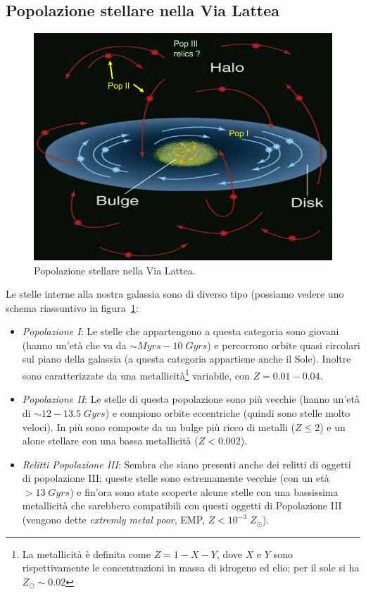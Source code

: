 \subsection{Popolazione stellare nella Via Lattea}
\begin{figure}
    \centering
    \includegraphics[width = 0.5 \textwidth]{immagini/popolazione-stellare-via-lattea.png}
    \caption{Popolazione stellare nella Via Lattea.}
    \label{fig:popolazione-stellare-via-lattea}
\end{figure}
Le stelle interne alla nostra galassia sono di diverso tipo (possiamo vedere uno schema riassuntivo in figura~\ref{fig:popolazione-stellare-via-lattea}:
\begin{itemize}
    \item \emph{Popolazione I}: Le stelle che appartengono a questa categoria sono giovani (hanno un'età che va da $\sim \si{Myrs} - 10 \;\si{Gyrs}$) e percorrono orbite quasi circolari sul piano della galassia (a questa categoria appartiene anche il Sole). Inoltre sono caratterizzate da una metallicità\footnote{La metallicità è definita come $Z = 1-X-Y$, dove $X$ e $Y$ sono rispettivamente le concentrazioni in massa di idrogeno ed elio; per il sole si ha $Z_{\odot}\sim 0.02$} variabile, con $Z=0.01-0.04$. 
    \item \emph{Popolazione II}: Le stelle di questa popolazione sono più vecchie (hanno un'età di $\sim 12 - 13.5 \; \si{Gyrs}$) e compiono orbite eccentriche (quindi sono stelle molto veloci). In più sono composte da un bulge più ricco di metalli ($Z \leq 2$) e un alone stellare con una bassa metallicità ($Z < 0.002$).
    \item \emph{Relitti Popolazione III}: Sembra che siano presenti anche dei relitti di oggetti di popolazione III; queste stelle sono estremamente vecchie (con un età $> 13 \; \si{Gyrs}$) e fin'ora sono state scoperte alcune stelle con una bassissima metallicità che sarebbero compatibili con questi oggetti di Popolazione III (vengono dette \emph{extremly metal poor}, EMP, $Z < 10^{-3} \;Z_{\odot}$).
\end{itemize}

